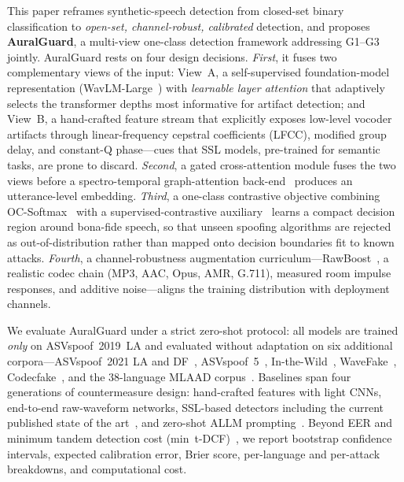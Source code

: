 This paper reframes synthetic-speech detection from closed-set binary classification to
\emph{open-set, channel-robust, calibrated} detection, and proposes
\textbf{AuralGuard}, a multi-view one-class detection framework addressing G1--G3
jointly. AuralGuard rests on four design decisions. \emph{First}, it fuses two
complementary views of the input: View~A, a self-supervised foundation-model
representation (WavLM-Large~\cite{chen2022wavlm}) with \emph{learnable layer attention}
that adaptively selects the transformer depths most informative for artifact detection;
and View~B, a hand-crafted feature stream that explicitly exposes low-level vocoder
artifacts through linear-frequency cepstral coefficients (LFCC), modified group delay,
and constant-Q phase---cues that SSL models, pre-trained for semantic tasks, are prone
to discard. \emph{Second}, a gated cross-attention module fuses the two views before a
spectro-temporal graph-attention back-end~\cite{jung2022aasist} produces an
utterance-level embedding. \emph{Third}, a one-class contrastive objective combining
OC-Softmax~\cite{zhang2021oneclass} with a supervised-contrastive
auxiliary~\cite{khosla2020supcon} learns a compact decision region around bona-fide
speech, so that unseen spoofing algorithms are rejected as out-of-distribution rather
than mapped onto decision boundaries fit to known attacks. \emph{Fourth}, a
channel-robustness augmentation curriculum---RawBoost~\cite{tak2022rawboost}, a
realistic codec chain (MP3, AAC, Opus, AMR, G.711), measured room impulse responses,
and additive noise---aligns the training distribution with deployment channels.

We evaluate AuralGuard under a strict zero-shot protocol: all models are trained
\emph{only} on ASVspoof~2019~LA and evaluated without adaptation on six additional
corpora---ASVspoof~2021 LA and DF~\cite{liu2023asvspoof2021},
ASVspoof~5~\cite{wang2025asvspoof5journal}, In-the-Wild~\cite{muller2022inthewild},
WaveFake~\cite{frank2021wavefake}, Codecfake~\cite{xie2025codecfake}, and the
38-language MLAAD corpus~\cite{muller2024mlaad}. Baselines span four generations of
countermeasure design: hand-crafted features with light CNNs, end-to-end raw-waveform
networks, SSL-based detectors including the current published state of the
art~\cite{tak2022automatic,xiao2025xlsrmamba,zhu2024slim}, and zero-shot ALLM
prompting~\cite{gong2025allm4add}. Beyond EER and minimum tandem detection cost
(min~t-DCF)~\cite{kinnunen2020tdcf}, we report bootstrap confidence intervals, expected
calibration error, Brier score, per-language and per-attack breakdowns, and
computational cost.

